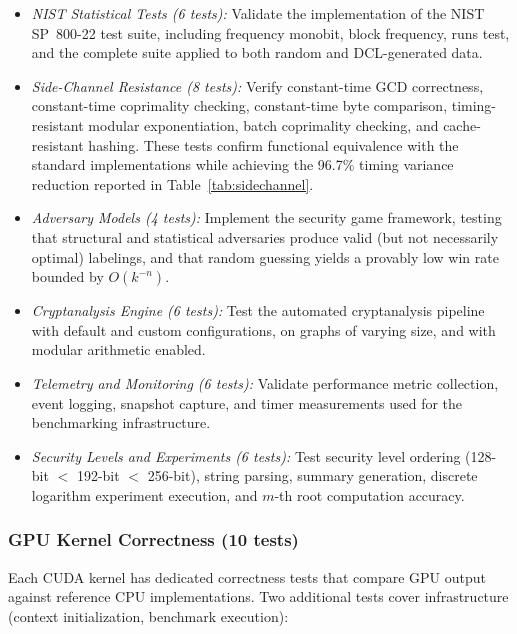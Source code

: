 \documentclass[lettersize,journal]{IEEEtran}
\begin{document}
\begin{itemize}
\item \emph{NIST Statistical Tests (6 tests):} Validate the implementation of the NIST SP~800-22 test suite, including frequency monobit, block frequency, runs test, and the complete suite applied to both random and DCL-generated data.

\item \emph{Side-Channel Resistance (8 tests):} Verify constant-time GCD correctness, constant-time coprimality checking, constant-time byte comparison, timing-resistant modular exponentiation, batch coprimality checking, and cache-resistant hashing. These tests confirm functional equivalence with the standard implementations while achieving the 96.7\% timing variance reduction reported in Table~\ref{tab:sidechannel}.

\item \emph{Adversary Models (4 tests):} Implement the security game framework, testing that structural and statistical adversaries produce valid (but not necessarily optimal) labelings, and that random guessing yields a provably low win rate bounded by $O(k^{-n})$.

\item \emph{Cryptanalysis Engine (6 tests):} Test the automated cryptanalysis pipeline with default and custom configurations, on graphs of varying size, and with modular arithmetic enabled.

\item \emph{Telemetry and Monitoring (6 tests):} Validate performance metric collection, event logging, snapshot capture, and timer measurements used for the benchmarking infrastructure.

\item \emph{Security Levels and Experiments (6 tests):} Test security level ordering (128-bit $<$ 192-bit $<$ 256-bit), string parsing, summary generation, discrete logarithm experiment execution, and $m$-th root computation accuracy.
\end{itemize}

\subsubsection{GPU Kernel Correctness (10 tests)}
Each CUDA kernel has dedicated correctness tests that compare GPU output against reference CPU implementations. Two additional tests cover infrastructure (context initialization, benchmark execution):
\end{document}
